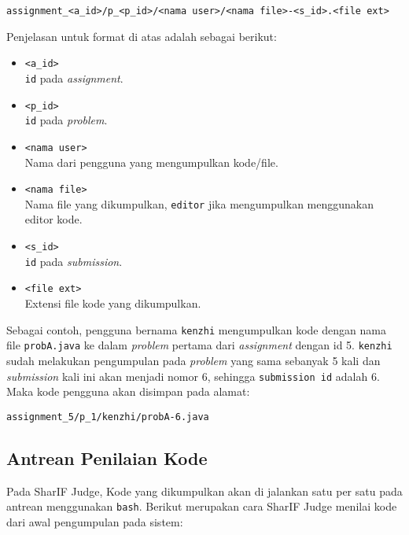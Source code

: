 \begin{center}
	\verb|assignment_<a_id>/p_<p_id>/<nama user>/<nama file>-<s_id>.<file ext>|
\end{center}

Penjelasan untuk format di atas adalah sebagai berikut:

\begin{itemize}
	\item \verb|<a_id>| \\
	      \verb|id| pada \textit{assignment}.
	\item \verb|<p_id>| \\
	      \verb|id| pada \textit{problem}.
	\item \verb|<nama user>| \\
	      Nama dari pengguna yang mengumpulkan kode/file.
	\item \verb|<nama file>| \\
	      Nama file yang dikumpulkan, \verb|editor| jika mengumpulkan menggunakan editor kode.
	\item \verb|<s_id>| \\
	      \verb|id| pada \textit{submission}.
	\item \verb|<file ext>| \\
	      Extensi file kode yang dikumpulkan.
\end{itemize}

Sebagai contoh, pengguna bernama \verb|kenzhi| mengumpulkan kode dengan nama file \verb|probA.java| ke dalam \textit{problem} pertama dari \textit{assignment} dengan id 5. \verb|kenzhi| sudah melakukan pengumpulan pada \textit{problem} yang sama sebanyak 5 kali dan \textit{submission} kali ini akan menjadi nomor 6, sehingga \verb|submission id| adalah 6. Maka kode pengguna akan disimpan pada alamat:

\begin{center}
	\verb|assignment_5/p_1/kenzhi/probA-6.java|
\end{center}

\subsection{Antrean Penilaian Kode}
\label{sub:3:1:antreanpenilaiankode}

Pada SharIF Judge, Kode yang dikumpulkan akan di jalankan satu per satu pada antrean menggunakan \verb|bash|. Berikut merupakan cara SharIF Judge menilai kode dari awal pengumpulan pada sistem:

